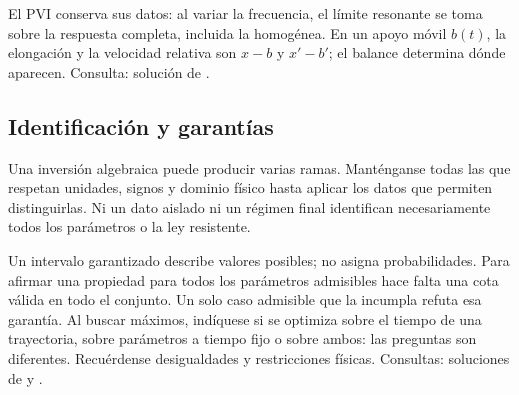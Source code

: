 El PVI conserva sus datos: al variar la frecuencia, el límite resonante
se toma sobre la respuesta completa, incluida la homogénea. En un apoyo
móvil $b(t)$, la elongación y la velocidad relativa son $x-b$ y $x'-b'$;
el balance determina dónde aparecen. Consulta: solución de
.

%
\subsection*{Identificación y garantías}
\label{CH05-B04}
Una inversión algebraica puede producir varias ramas. Manténganse todas
las que respetan unidades, signos y dominio físico hasta aplicar los datos
que permiten distinguirlas. Ni un dato aislado ni un régimen final
identifican necesariamente todos los parámetros o la ley resistente.

Un intervalo garantizado describe valores posibles; no asigna
probabilidades. Para afirmar una propiedad para todos los parámetros
admisibles hace falta una cota válida en todo el conjunto. Un solo caso
admisible que la incumpla refuta esa garantía. Al buscar máximos, indíquese
si se optimiza sobre el tiempo de una trayectoria, sobre parámetros a
tiempo fijo o sobre ambos: las preguntas son diferentes. Recuérdense
desigualdades y restricciones físicas. Consultas: soluciones de
 y .
